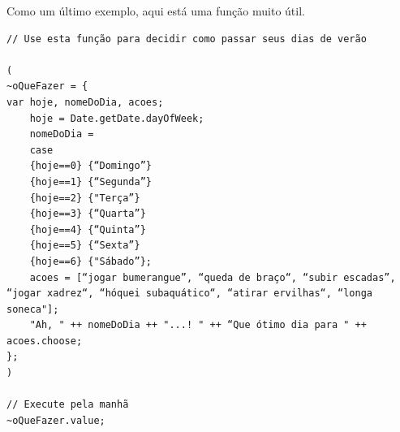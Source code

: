 Como um último exemplo, aqui está uma função muito útil.
 
\begin{lstlisting}[style=SuperCollider-IDE, basicstyle=\scttfamily\footnotesize]
// Use esta função para decidir como passar seus dias de verão

(
~oQueFazer = { 
var hoje, nomeDoDia, acoes;
	hoje = Date.getDate.dayOfWeek;
	nomeDoDia = 
	case
	{hoje==0} {“Domingo”}
	{hoje==1} {“Segunda”}
	{hoje==2} {"Terça”}
	{hoje==3} {“Quarta”}
	{hoje==4} {“Quinta”}
	{hoje==5} {“Sexta”}
	{hoje==6} {"Sábado”};
	acoes = [“jogar bumerangue”, “queda de braço“, “subir escadas”, “jogar xadrez“, “hóquei subaquático“, “atirar ervilhas“, “longa soneca"];
	"Ah, " ++ nomeDoDia ++ "...! " ++ “Que ótimo dia para " ++ acoes.choose;
};
)

// Execute pela manhã
~oQueFazer.value;
\end{lstlisting}

\bigskip
{} 

